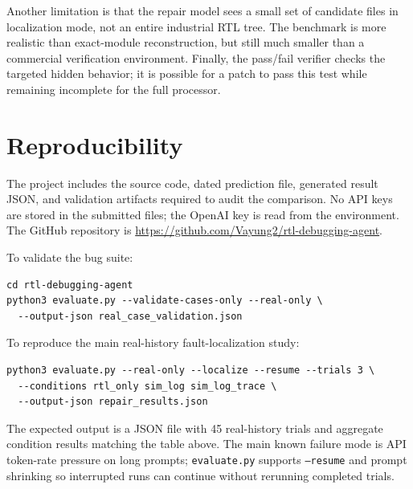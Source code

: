 \documentclass[11pt]{article}
\begin{document}
Another limitation is that the repair model sees a small set of candidate files
in localization mode, not an entire industrial RTL tree. The benchmark is more
realistic than exact-module reconstruction, but still much smaller than a
commercial verification environment. Finally, the pass/fail verifier checks the
targeted hidden behavior; it is possible for a patch to pass this test while
remaining incomplete for the full processor.

\section*{Reproducibility}
The project includes the source code, dated prediction file, generated result
JSON, and validation artifacts required to audit the comparison. No API keys are
stored in the submitted files; the OpenAI key is read from the environment. The
GitHub repository is
\url{https://github.com/Vayung2/rtl-debugging-agent}.

To validate the bug suite:
\begin{lstlisting}[basicstyle=\ttfamily\small]
cd rtl-debugging-agent
python3 evaluate.py --validate-cases-only --real-only \
  --output-json real_case_validation.json
\end{lstlisting}

To reproduce the main real-history fault-localization study:
\begin{lstlisting}[basicstyle=\ttfamily\small]
python3 evaluate.py --real-only --localize --resume --trials 3 \
  --conditions rtl_only sim_log sim_log_trace \
  --output-json repair_results.json
\end{lstlisting}

The expected output is a JSON file with 45 real-history trials and aggregate
condition results matching the table above. The main known failure mode is API
token-rate pressure on long prompts; \texttt{evaluate.py} supports
\texttt{--resume} and prompt shrinking so interrupted runs can continue without
rerunning completed trials.
\end{document}
